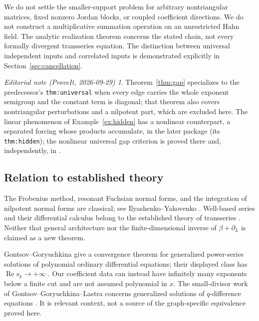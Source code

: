 \documentclass[11pt,a4paper]{article}
\numberwithin{equation}{section}
\theoremstyle{definition}
\theoremstyle{remark}
\newtheorem*{ednote}{Editorial note (ProveIt, 2026-09-29)}
\begin{document}
We do not settle the smaller-support problem for arbitrary nontriangular
matrices, fixed nonzero Jordan blocks, or coupled coefficient directions.
We do not construct a multiplicative summation operation on an unrestricted
Hahn field. The analytic realization theorem concerns the stated chain,
not every formally divergent transseries equation. The distinction between
universal independent inputs and correlated inputs is demonstrated
explicitly in Section~\ref{sec:cancellation}.
\begin{ednote}
Theorem~\ref{thm:gap} specializes to the predecessor's
\texttt{thm:universal} \cite{repo-hahn} when every edge carries the whole
exponent semigroup and the constant term is diagonal; that theorem also
covers nontriangular perturbations and a nilpotent part, which are excluded
here. The linear phenomenon of Example~\ref{ex:hidden} has a nonlinear
counterpart, a separated forcing whose products accumulate, in the later
package  (its
\texttt{thm:hidden}); the nonlinear universal gap criterion is proved there
and, independently, in .
\end{ednote}

\subsection{Relation to established theory}
The Frobenius method, resonant Fuchsian normal forms, and the integration of
nilpotent normal forms are classical; see Ilyashenko--Yakovenko
\cite{iy,yakovenko}. Well-based series and their differential calculus belong
to the established theory of transseries \cite{vdh}. Neither that general
architecture nor the finite-dimensional inverse of
$\beta+\partial_L$ is claimed as a new theorem.

Gontsov--Goryuchkina give a convergence theorem for generalized power-series
solutions of polynomial ordinary differential equations; their displayed
class has $\operatorname{Re}s_k\to+\infty$ \cite{gg}. Our coefficient data can
instead have infinitely many exponents below a finite cut and are not
assumed polynomial in $x$. The small-divisor work of
Gontsov--Goryuchkina--Lastra concerns generalized solutions of
$q$-difference equations \cite{ggl}. It is relevant context, not a source of
the graph-specific equivalence proved here.
\end{document}
